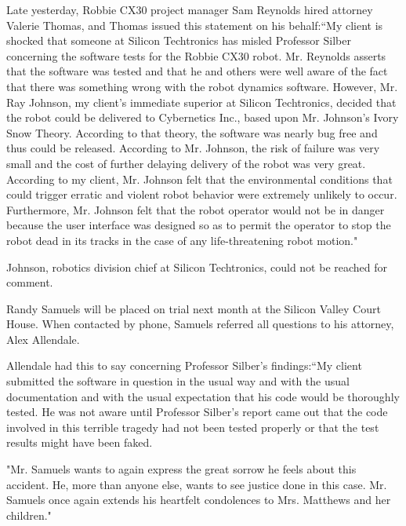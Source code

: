 Late yesterday, Robbie CX30 project manager Sam Reynolds hired attorney Valerie Thomas, and Thomas issued this statement on his behalf:``My client is shocked that someone at Silicon Techtronics has misled Professor Silber concerning the software tests for the Robbie CX30 robot. Mr. Reynolds asserts that the software was tested and that he and others were well aware of the fact that there was something wrong with the robot dynamics software. However, Mr. Ray Johnson, my client's immediate superior at Silicon Techtronics, decided that the robot could be delivered to Cybernetics Inc., based upon Mr. Johnson's Ivory Snow Theory. According to that theory, the software was nearly bug free and thus could be released. According to Mr. Johnson, the risk of failure was very small and the cost of further delaying delivery of the robot was very great. According to my client, Mr. Johnson felt that the environmental conditions that could trigger erratic and violent robot behavior were extremely unlikely to occur. Furthermore, Mr. Johnson felt that the robot operator would not be in danger because the user interface was designed so as to permit the operator to stop the robot dead in its tracks in the case of any life-threatening robot motion."

Johnson, robotics division chief at Silicon Techtronics, could not be reached for comment.

Randy Samuels will be placed on trial next month at the Silicon Valley Court House. When contacted by phone, Samuels referred all questions to his attorney, Alex Allendale.

Allendale had this to say concerning Professor Silber's findings:``My client submitted the software in question in the usual way and with the usual documentation and with the usual expectation that his code would be thoroughly tested. He was not aware until Professor Silber's report came out that the code involved in this terrible tragedy had not been tested properly or that the test results might have been faked.

"Mr. Samuels wants to again express the great sorrow he feels about this accident. He, more than anyone else, wants to see justice done in this case. Mr. Samuels once again extends his heartfelt condolences to Mrs. Matthews and her children."
